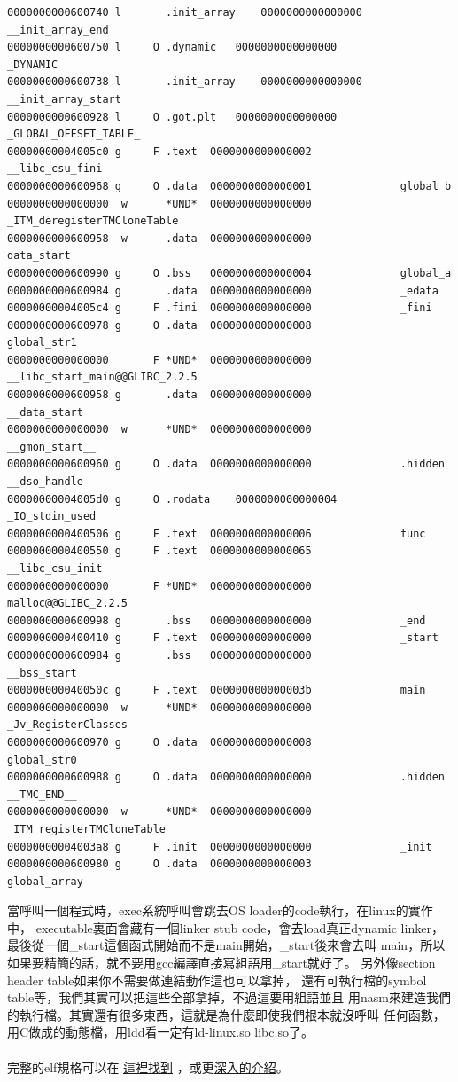 \begin{verbatim}
0000000000600740 l       .init_array	0000000000000000              __init_array_end
0000000000600750 l     O .dynamic	0000000000000000              _DYNAMIC
0000000000600738 l       .init_array	0000000000000000              __init_array_start
0000000000600928 l     O .got.plt	0000000000000000              _GLOBAL_OFFSET_TABLE_
00000000004005c0 g     F .text	0000000000000002              __libc_csu_fini
0000000000600968 g     O .data	0000000000000001              global_b
0000000000000000  w      *UND*	0000000000000000              _ITM_deregisterTMCloneTable
0000000000600958  w      .data	0000000000000000              data_start
0000000000600990 g     O .bss	0000000000000004              global_a
0000000000600984 g       .data	0000000000000000              _edata
00000000004005c4 g     F .fini	0000000000000000              _fini
0000000000600978 g     O .data	0000000000000008              global_str1
0000000000000000       F *UND*	0000000000000000              __libc_start_main@@GLIBC_2.2.5
0000000000600958 g       .data	0000000000000000              __data_start
0000000000000000  w      *UND*	0000000000000000              __gmon_start__
0000000000600960 g     O .data	0000000000000000              .hidden __dso_handle
00000000004005d0 g     O .rodata	0000000000000004              _IO_stdin_used
0000000000400506 g     F .text	0000000000000006              func
0000000000400550 g     F .text	0000000000000065              __libc_csu_init
0000000000000000       F *UND*	0000000000000000              malloc@@GLIBC_2.2.5
0000000000600998 g       .bss	0000000000000000              _end
0000000000400410 g     F .text	0000000000000000              _start
0000000000600984 g       .bss	0000000000000000              __bss_start
000000000040050c g     F .text	000000000000003b              main
0000000000000000  w      *UND*	0000000000000000              _Jv_RegisterClasses
0000000000600970 g     O .data	0000000000000008              global_str0
0000000000600988 g     O .data	0000000000000000              .hidden __TMC_END__
0000000000000000  w      *UND*	0000000000000000              _ITM_registerTMCloneTable
00000000004003a8 g     F .init	0000000000000000              _init
0000000000600980 g     O .data	0000000000000003              global_array
  \end{verbatim}
  當呼叫一個程式時，exec系統呼叫會跳去OS loader的code執行，在linux的實作中，
  executable裏面會藏有一個linker stub code，會去load真正dynamic linker，
  最後從一個\_start這個函式開始而不是main開始，\_start後來會去叫
  main，所以如果要精簡的話，就不要用gcc編譯直接寫組語用\_start就好了。
  另外像section header table如果你不需要做連結動作這也可以拿掉，
  還有可執行檔的symbol table等，我們其實可以把這些全部拿掉，不過這要用組語並且
  用nasm來建造我們的執行檔。其實還有很多東西，這就是為什麼即使我們根本就沒呼叫
  任何函數，用C做成的動態檔，用ldd看一定有ld-linux.so libc.so了。
  \\\\
  完整的elf規格可以在
  \href{http://en.wikipedia.org/wiki/Executable_and_Linkable_Format}{這裡找到}
  ，或更\href{http://www.akkadia.org/drepper/dsohowto.pdf}{深入的介紹}。

